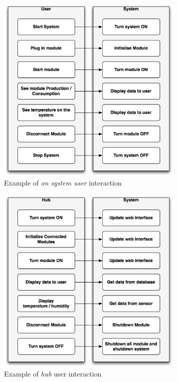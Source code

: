 \begin{figure}[H]
	\begin{centering}
		 \includegraphics[width=0.8\textwidth]{images/sys_int.png}
		\caption{Example of \textit{on system user} interaction}
	\end{centering}
\end{figure}

\begin{figure}[H]
	\begin{centering}
		 \includegraphics[width=0.8\textwidth]{images/hub_int.png}
		\caption{Example of \textit{hub} user interaction}
	\end{centering}
\end{figure}
	

